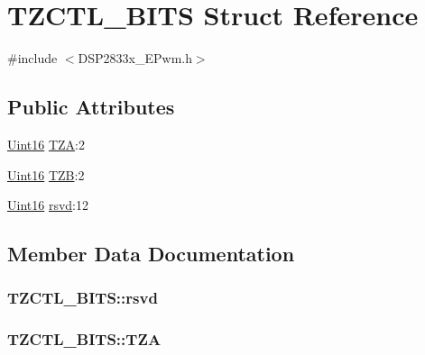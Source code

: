 \hypertarget{struct_t_z_c_t_l___b_i_t_s}{}\section{T\+Z\+C\+T\+L\+\_\+\+B\+I\+T\+S Struct Reference}
\label{struct_t_z_c_t_l___b_i_t_s}


{\ttfamily \#include $<$D\+S\+P2833x\+\_\+\+E\+Pwm.\+h$>$}

\subsection*{Public Attributes}
\begin{DoxyCompactItemize}
\item 
\hyperlink{_d_s_p2833x___device_8h_a59a9f6be4562c327cbfb4f7e8e18f08b}{Uint16} \hyperlink{struct_t_z_c_t_l___b_i_t_s_a7557ecc52712f5bf212cbb1f56132af4}{T\+Z\+A}\+:2
\item 
\hyperlink{_d_s_p2833x___device_8h_a59a9f6be4562c327cbfb4f7e8e18f08b}{Uint16} \hyperlink{struct_t_z_c_t_l___b_i_t_s_a04447a5e9e039ca172fe8e6168243cf2}{T\+Z\+B}\+:2
\item 
\hyperlink{_d_s_p2833x___device_8h_a59a9f6be4562c327cbfb4f7e8e18f08b}{Uint16} \hyperlink{struct_t_z_c_t_l___b_i_t_s_a92b96b19d8e95c951715f6ddfb5780ba}{rsvd}\+:12
\end{DoxyCompactItemize}


\subsection{Member Data Documentation}
\hypertarget{struct_t_z_c_t_l___b_i_t_s_a92b96b19d8e95c951715f6ddfb5780ba}{}
\subsubsection[{rsvd}]{ T\+Z\+C\+T\+L\+\_\+\+B\+I\+T\+S\+::rsvd}\label{struct_t_z_c_t_l___b_i_t_s_a92b96b19d8e95c951715f6ddfb5780ba}
\hypertarget{struct_t_z_c_t_l___b_i_t_s_a7557ecc52712f5bf212cbb1f56132af4}{}
\subsubsection[{T\+Z\+A}]{ T\+Z\+C\+T\+L\+\_\+\+B\+I\+T\+S\+::\+T\+Z\+A}\label{struct_t_z_c_t_l___b_i_t_s_a7557ecc52712f5bf212cbb1f56132af4}
\hypertarget{struct_t_z_c_t_l___b_i_t_s_a04447a5e9e039ca172fe8e6168243cf2}{}
